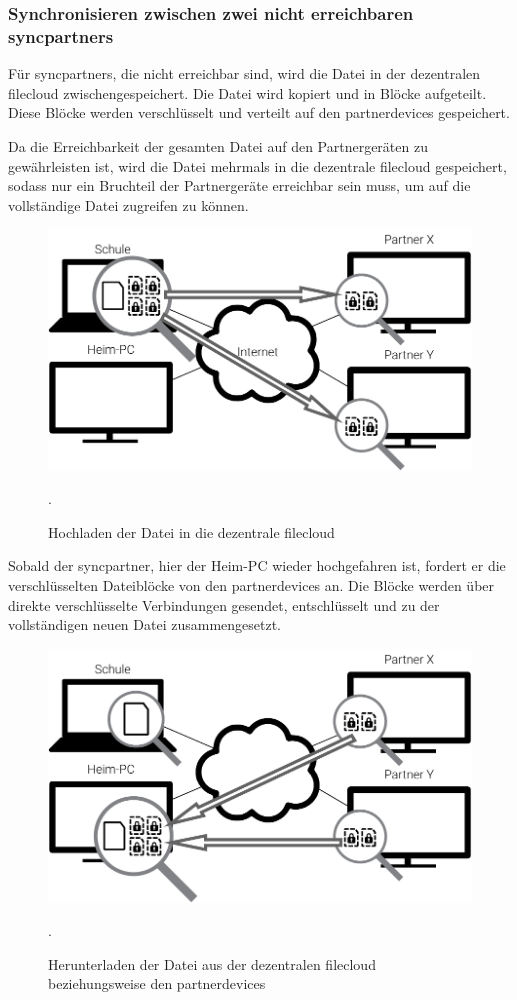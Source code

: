 \subsubsection{Synchronisieren zwischen zwei nicht erreichbaren \glspl{syncpartner}}
Für \glspl{syncpartner}, die nicht erreichbar sind, wird die Datei in der dezentralen
\gls{filecloud} zwischengespeichert. Die Datei wird kopiert und in Blöcke
aufgeteilt. Diese Blöcke werden verschlüsselt und verteilt auf den
\glspl{partnerdevice} gespeichert.

Da die Erreichbarkeit der gesamten Datei auf den Partnergeräten zu gewährleisten
ist, wird die Datei mehrmals
in die dezentrale \gls{filecloud} gespeichert, sodass nur ein Bruchteil der
Partnergeräte erreichbar sein muss, um auf die vollständige Datei zugreifen zu
können.

\begin{figure}[h]
	\centering
  \includegraphics[]{images/sblit_upload}
  \caption{Hochladen der Datei in die dezentrale \gls{filecloud}}.
\end{figure}

Sobald der \gls{syncpartner}, hier der Heim-PC wieder hochgefahren ist, fordert er die
verschlüsselten Dateiblöcke von den \glspl{partnerdevice} an. Die Blöcke werden über
direkte verschlüsselte Verbindungen gesendet, entschlüsselt und zu der
vollständigen neuen Datei zusammengesetzt.


\begin{figure}[h]
	\centering
  \includegraphics[]{images/sblit_download}
  \caption{Herunterladen der Datei aus der dezentralen \gls{filecloud} beziehungsweise
	den \glspl{partnerdevice}}.
\end{figure}
